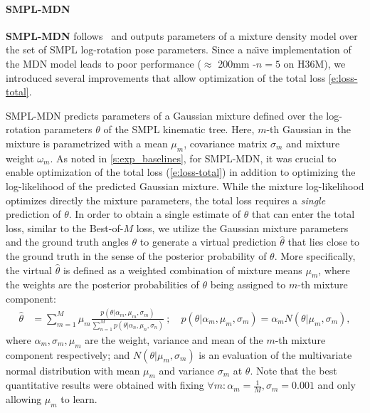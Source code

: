 \paragraph{SMPL-MDN}

\textbf{SMPL-MDN} follows~\cite{li19generating} and outputs parameters of a mixture density model over the set of SMPL log-rotation pose parameters. 
Since a na\"{\i}ve implementation of the MDN model leads to poor performance ($\approx$ 200mm \MPJPE-$n=5$ on H36M), we introduced several improvements that allow optimization of the total loss \cref{e:loss-total}.


SMPL-MDN predicts parameters of a Gaussian mixture defined over the log-rotation parameters $\theta$ of the SMPL kinematic tree.
Here, $m$-th Gaussian in the mixture is parametrized with a mean $\mu_m$, covariance matrix $\sigma_m$ and mixture weight $\omega_m$.
As noted in \cref{s:exp_baselines}, for SMPL-MDN, it was crucial to enable optimization of the total loss (\ref{e:loss-total}) in addition to optimizing the log-likelihood of the predicted Gaussian mixture.
While the mixture log-likelihood optimizes directly the mixture parameters, the total loss requires a \emph{single} prediction of $\theta$.
In order to obtain a single estimate of $\theta$ that can enter the total loss, similar to the Best-of-$M$ loss, we utilize the Gaussian mixture parameters and the ground truth angles $\theta$ to generate a virtual prediction $\hat \theta$ that lies close to the ground truth in the sense of the posterior probability of $\theta$.
More specifically, the virtual $\hat \theta$ is defined as a weighted combination of mixture means $\mu_m$, where the weights are the posterior probabilities of $\theta$ being assigned to $m$-th mixture component:
\begin{align}
\hat \theta &= 
\sum_{m=1}^{M} \mu_m 
\frac{
     p(\theta | \alpha_m, \mu_m, \sigma_m)
}{
    \sum_{n=1}^{M} p(\theta | \alpha_n, \mu_n, \sigma_n)
} ~ ; \quad
p(\theta | \alpha_m, \mu_m, \sigma_m)
= \alpha_m N( \theta | \mu_m, \sigma_m),
\end{align}
where $\alpha_m, \sigma_m, \mu_m$ are the weight, variance and mean of the $m$-th mixture component respectively; and $N( \theta | \mu_m, \sigma_m)$ is an evaluation of the multivariate normal distribution with mean $\mu_m$ and variance $\sigma_m$ at $\theta$. Note that the best quantitative results were obtained with fixing $\forall m: \alpha_m = \frac{1}{M}, \sigma_m = 0.001$ and only allowing $\mu_m$ to learn.

